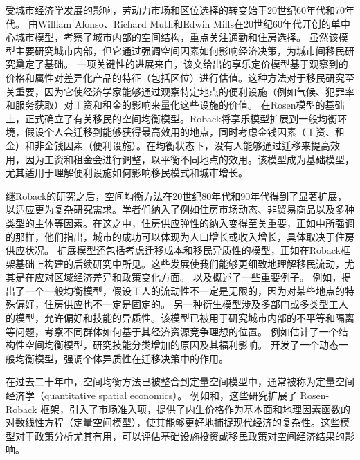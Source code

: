 \documentclass[a4paper,12pt,oneside, fontset=mac]{ctexbook} %
\begin{document}
受城市经济学发展的影响，劳动力市场和区位选择的转变始于20世纪60年代和70年代。
由William Alonso、Richard Muth和Edwin Mills在20世纪60年代开创的单中心城市模型，考察了城市内部的空间结构，重点关注通勤和住房选择。
虽然该模型主要研究城市内部，但它通过强调空间因素如何影响经济决策，为城市间移民研究奠定了基础。
一项关键性的进展来自\cite{rosenHedonicPricesImplicit1974}，该文给出的享乐定价模型基于观察到的价格和属性对差异化产品的特征（包括区位）进行估值。这种方法对于移民研究至关重要，因为它使经济学家能够通过观察特定地点的便利设施（例如气候、犯罪率和服务获取）对工资和租金的影响来量化这些设施的价值。
在Rosen模型的基础上，\cite{robackWagesRentsQuality1982}正式确立了有关移民的空间均衡模型。Roback将享乐模型扩展到一般均衡环境，假设个人会迁移到能够获得最高效用的地点，同时考虑金钱因素（工资、租金）和非金钱因素（便利设施）。在均衡状态下，没有人能够通过迁移来提高效用，因为工资和租金会进行调整，以平衡不同地点的效用。该模型成为基础模型，尤其适用于理解便利设施如何影响移民模式和城市增长。

继Roback的研究之后，空间均衡方法在20世纪80年代和90年代得到了显著扩展，以适应更为复杂研究需求。学者们纳入了例如住房市场动态、非贸易商品以及多种类型的主体等因素。在这之中，住房供应弹性的纳入变得至关重要，正如\cite{glaeserWealthCitiesAgglomeration2009}中所强调的那样，他们指出，城市的成功可以体现为人口增长或收入增长，具体取决于住房供应状况。
扩展模型还包括考虑迁移成本和移民异质性的模型，正如在Roback框架基础上构建的后续研究中所见。这些发展使我们能够更细致地理解移民流动，尤其是在应对区域经济差异和政策变化方面。
\cite{glaeserWealthCitiesAgglomeration2009}以及\cite{morettiLocalLaborMarkets2011}概述了一些重要例子。
例如，\cite{morettiLocalLaborMarkets2011}提出了一个一般均衡模型，假设工人的流动性不一定是无限的，因为对某些地点的特殊偏好，住房供应也不一定是固定的。
另一种衍生模型涉及多部门或多类型工人的模型，允许偏好和技能的异质性。该模型已被用于研究城市内部的不平等和隔离等问题，考察不同群体如何基于其经济资源竞争理想的位置。
例如\cite{diamondDeterminantsWelfareImplications2016}估计了一个结构性空间均衡模型，研究技能分类增加的原因及其福利影响。
\cite{coen-piraniEffectHouseholdAppliances2010}开发了一个动态一般均衡模型，强调个体异质性在迁移决策中的作用。

在过去二十年中，空间均衡方法已被整合到定量空间模型中，通常被称为定量空间经济学（quantitative spatial economics）。
例如\cite{ahlfeldtEconomicsDensityEvidence2015}和\cite{reddingQuantitativeSpatialEconomics2017}，这些研究扩展了 Rosen-Roback 框架，引入了市场准入项，提供了内生价格作为基本面和地理因素函数的对数线性方程（定量空间模型），使其能够更好地捕捉现代经济的复杂性。这些模型对于政策分析尤其有用，可以评估基础设施投资或移民政策对空间经济结果的影响。
\end{document}
